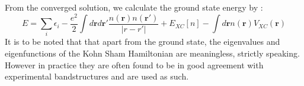 \documentclass[12pt,a4paper]{article}
\newcommand{\rmb}{\mathbf{r}}
\begin{document}
From the converged solution, we calculate the ground state energy by :
\begin{equation}
E=\sum_i \epsilon_i - \dfrac{e^2}{2}\int d\rmb d\rmb' \dfrac{n(\rmb) n(\rmb')}{|r-r'|} +E_{XC}[n] -\int d \rmb n(\rmb) V_{XC}(\rmb)
\end{equation}
It is to be noted that that apart from the ground state, the eigenvalues and eigenfunctions of the Kohn Sham Hamiltonian are meaningless, strictly speaking. However in practice they are often found to be in good agreement with experimental bandstructures and are used as such.









	 
 


 
\end{document}
